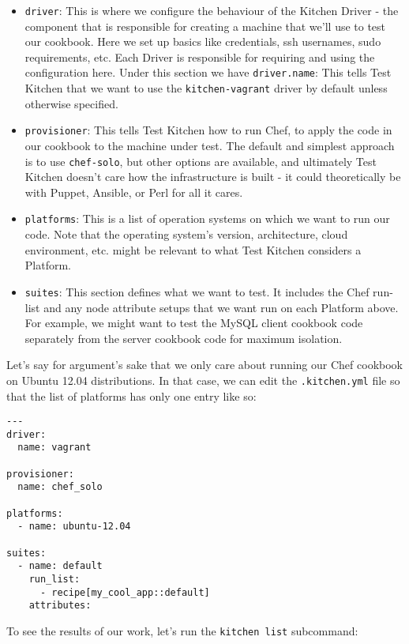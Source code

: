 \begin{itemize}
  \item \lstinline!driver!: This is where we configure the behaviour of the Kitchen Driver - the component that is responsible for creating a machine that we'll use to test our cookbook. Here we set up basics like credentials, ssh usernames, sudo requirements, etc. Each Driver is responsible for requiring and using the configuration here. Under this section we have \lstinline!driver.name!: This tells Test Kitchen that we want to use the \lstinline!kitchen-vagrant! driver by default unless otherwise specified.
  \item \lstinline!provisioner!: This tells Test Kitchen how to run Chef, to apply the code in our cookbook to the machine under test. The default and simplest approach is to use \lstinline!chef-solo!, but other options are available, and ultimately Test Kitchen doesn't care how the infrastructure is built - it could theoretically be with Puppet, Ansible, or Perl for all it cares.
  \item \lstinline!platforms!: This is a list of operation systems on which we want to run our code. Note that the operating system's version, architecture, cloud environment, etc. might be relevant to what Test Kitchen considers a Platform.
  \item \lstinline!suites!: This section defines what we want to test. It includes the Chef run-list and any node attribute setups that we want run on each Platform above. For example, we might want to test the MySQL client cookbook code separately from the server cookbook code for maximum isolation.
\end{itemize}

Let's say for argument's sake that we only care about running our Chef cookbook on Ubuntu 12.04 distributions. In that case, we can edit the \lstinline!.kitchen.yml! file so that the list of platforms has only one entry like so:

\begin{lstlisting}[label=lst:testing-test-kitchen5]
---
driver:
  name: vagrant

provisioner:
  name: chef_solo

platforms:
  - name: ubuntu-12.04

suites:
  - name: default
    run_list:
      - recipe[my_cool_app::default]
    attributes:
\end{lstlisting}

To see the results of our work, let's run the \lstinline!kitchen list! subcommand:

